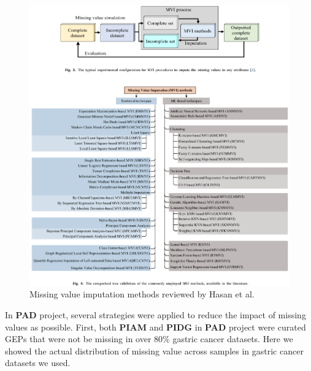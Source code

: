 \documentclass[
  12pt,
]{book}
\begin{document}
\begin{figure}

{\centering \includegraphics[width=0.9\linewidth]{./fig/mvi-01} 

}

\caption{Missing value imputation methods reviewed by Hasan et al.}\label{fig:mvi01}
\end{figure}

In \textbf{PAD} project, several strategies were applied to reduce the impact of missing values as possible. First, both \textbf{PIAM} and \textbf{PIDG} in \textbf{PAD} project were curated GEPs that were not be missing in over 80\% gastric cancer datasets. Here we showed the actual distribution of missing value across samples in gastric cancer datasets we used.
\end{document}
